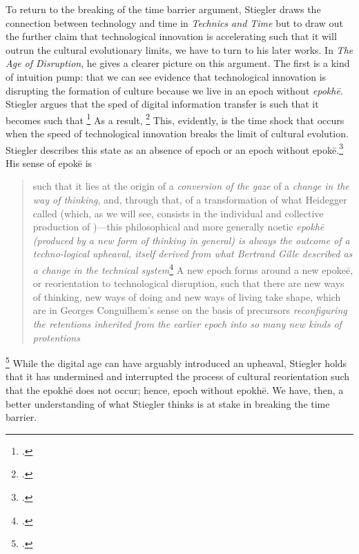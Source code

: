 \documentclass[letterpaper,notitlepage,12pt]{article}
\begin{document}
To return to the breaking of the time barrier argument, Stiegler draws the
connection between technology and time in \textit{Technics and Time} but to draw
out the further claim that technological innovation is accelerating such that it
will outrun the cultural evolutionary limits, we have to turn to his later
works.
In \textit{The Age of Disruption}, he gives a clearer picture on this argument.
The first is a kind of intuition pump: that we can see evidence that
technological innovation is disrupting the formation of culture because we live
in an epoch without \textit{epokh\={e}}. Stiegler argues that the sped of
digital information transfer is such that it becomes  such that \footcite[ch. 1.4]{stiegler_age_2019}
As a result, \footcite[ch. 1.5]{stiegler_age_2019}
This, evidently, is the time shock that occurs when the speed of technological
innovation breaks the limit of cultural evolution.
Stiegler describes this state as an absence of epoch or an epoch without
epok\={e}.\footcite[ch. 2.7]{stiegler_age_2019}
His sense of epok\={e} is \blockquote{such that it lies at the origin of a
  \textit{conversion of the gaze} of a \textit{change in the way of thinking},
  and, through that, of a transformation of what Heidegger called
   (which, as we will see, consists in the individual and collective
  production of )---this philosophical
  and more generally noetic \textit{epokh\={e} (produced by a new form of
    thinking in general) is \textit{always the outcome of a techno-logical
    upheaval}, itself derived from what Bertrand Gille described as a change in
  the technical system}\footcite[ch. 2.7]{stiegler_age_2019}
  A new epoch forms around a new epoke\={e}, or reorientation to technological
  disruption, such that there are new ways of thinking, new ways of
    doing and new ways of living take shape, which are  in Georges Conguilhem's sense on the basis of precursors
    \textit{reconfiguring the retentions inherited from the earlier epoch into
  so many new kinds of protentions}}\footcite[ch. 2.8]{stiegler_age_2019}
While the digital age can have arguably introduced an upheaval, Stiegler holds
that it has undermined and interrupted the process of cultural reorientation
such that the epokh\={e} does not occur; hence, epoch without epokh\={e}.
We have, then, a better understanding of what Stiegler thinks is at stake in
breaking the time barrier.
\end{document}
